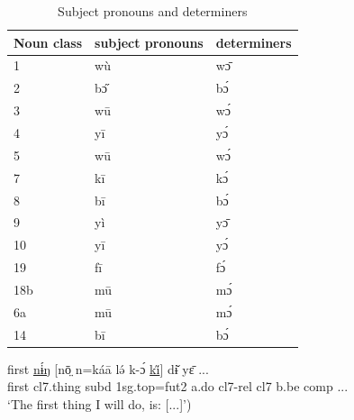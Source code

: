 \documentclass[10pt,twoside]{article}
\def\ci#1{{\ipaFont #1}}
\newcommand{\gl}[1]{`#1'}
\def\VSP{\vspace{0pt}}
\newcommand{\cl}[1]{{\sc cl#1}}
\def\Hline{\hline}
\begin{document}
\begin{table}[h!]%
	\centering
	\begin{tabular}[t]{p{3.5cm} l l } \Hline
	Noun class	&	{\sc subject pronouns}		& {\sc determiners}\\
	\Hline
			1		&	\ci{wù}	& \ci{wɔ̄}		\\			
			2		&	\ci{bɔ̋} 	& \ci{bɔ́}		\\
			3		&	\ci{wū}	& \ci{wɔ́}		\\
			4		&	 \ci{yī}	& \ci{yɔ́}		\\
			5		&	\ci{wū}	& \ci{wɔ́}		\\
			7		& 	\ci{kī}	& \ci{kɔ́}		\\
			8		& 	\ci{bī}	& \ci{bɔ́}		\\
			9		& 	\ci{yì}	& \ci{yɔ̄}		\\
			10		& 	\ci{yī}	& \ci{yɔ́}		\\
			19		&	\ci{fī}	& \ci{fɔ́}		\\
			18b		&	\ci{mū}	& \ci{mɔ́}		\\			
			6a		&	\ci{mū}	& \ci{mɔ́}		\\	
			14		& 	\ci{bī}	& \ci{bɔ́}		\\	

	\Hline	
	\end{tabular}
	\caption{Subject pronouns and determiners} \label{tabPronounsDeterminers}
\end{table} 

\begin{exe}
	\ex \label{exTheFirstThing} 		
		\gll first \uline{nɨ́ŋ} [nō̤ n=káā lə́ k-ɔ́ \uline{ki̋}] dɨ̌ yɛ̄ ...\\
		first	\cl7.thing	{\sc subd} {\sc 1sg.top}={\sc fut2}	a.do	\cl7-{\sc rel}	\cl7 	b.be	 {\sc comp}	... \\
		\glt \VSP \gl{The first thing I will do, is: [...]})
\end{exe}%
\end{document}
